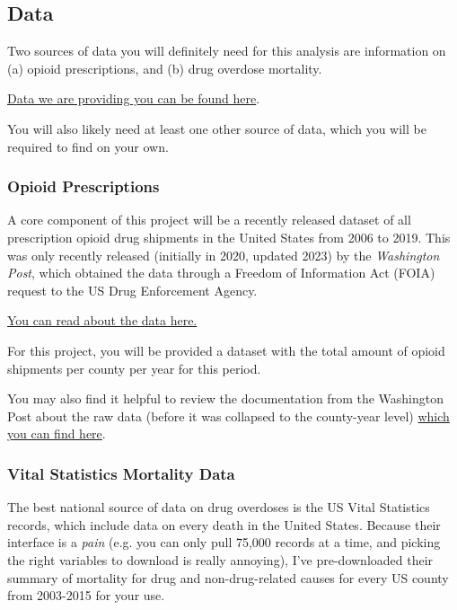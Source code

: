\documentclass[12pt]{article}
\begin{document}
\subsection*{Data}

Two sources of data you will definitely need for this analysis are information on (a) opioid prescriptions, and (b) drug overdose mortality. 

\href{https://github.com/nickeubank/ids540_opioid_data}{Data we are providing you can be found here}.

You will also likely need at least one other source of data, which you will be required to find on your own.

\subsubsection*{Opioid Prescriptions}

A core component of this project will be a recently released dataset of all prescription opioid drug shipments in the United States from 2006 to 2019. This was only recently released (initially in 2020, updated 2023) by the \emph{Washington Post}, which obtained the data through a Freedom of Information Act (FOIA) request to the US Drug Enforcement Agency.

\href{https://github.com/nickeubank/practicaldatascience_book/blob/main/ids720_specific/opioids/MoreThan100billionPainPillsSaturatedTheNationOverNineYears.pdf}{You can read about the data here.}

For this project, you will be provided a dataset with the total amount of opioid shipments per county per year for this period.

You may also find it helpful to review the documentation from the Washington Post about the raw data (before it was collapsed to the county-year level) \href{https://github.com/wpinvestigative/arcos-api/blob/master/data/data_dictionary.csv}{which you can find here}.

\subsubsection*{Vital Statistics Mortality Data}

The best national source of data on drug overdoses is the US Vital Statistics records, which include data on every death in the United States. Because their interface is a \emph{pain} (e.g. you can only pull 75,000 records at a time, and picking the right variables to download is really annoying), I've pre-downloaded their summary of mortality for drug and non-drug-related causes for every US county from 2003-2015 for your use.
\end{document}
